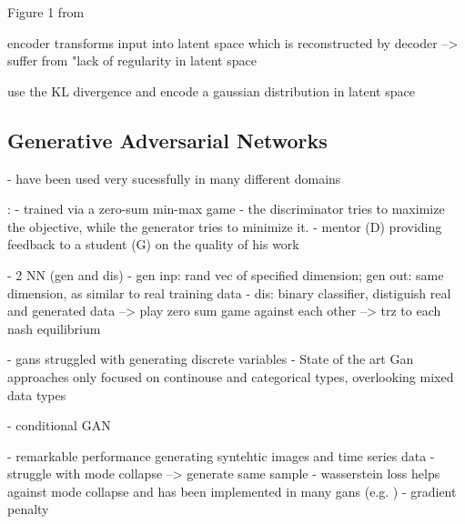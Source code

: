 Figure 1 from \cite{razghandi2022VariationalAutoencoderGenerativea}

encoder transforms input into latent space which is reconstructed by decoder \cite{razghandi2022VariationalAutoencoderGenerativea}
--> suffer from "lack of regularity in latent space \cite{razghandi2022VariationalAutoencoderGenerativea}

use the KL divergence and encode a gaussian distribution in latent space \cite{razghandi2022VariationalAutoencoderGenerativea}


\subsection{Generative Adversarial Networks}
\label{ch:preliminaries-generativeAlgorithms-generativeAdversarialNetworks}

\cite{goodfellow2020GenerativeAdversarialNetworks}
- have been used very sucessfully in many different domains \cite{li2022TTSGANTransformerbasedTimeSeries}
 

\cite{zhao2022CTABGANEnhancingTabular}:
- trained via a zero-sum min-max game 
- the discriminator tries to maximize the objective, while the generator tries to minimize it.
- mentor (D) providing feedback to a student (G) on the quality of his work


\cite{li2022TTSGANTransformerbasedTimeSeries}
- 2 NN (gen and dis)
- gen inp: rand vec of specified dimension; gen out: same dimension, as similar to real training data
- dis: binary classifier, distiguish real and generated data
--> play zero sum game against each other
--> trz to each nash equilibrium

- gans struggled with generating discrete variables \cite{torfi2020CorGANCorrelationCapturingConvolutionala}
- State of the art Gan approaches only focused on continouse and categorical types, overlooking mixed data types \cite{zhao2022CTABGANEnhancingTabular}

- conditional GAN \cite{mirza2014ConditionalGenerativeAdversarial}


- remarkable performance generating syntehtic images and time series data \cite{mckeever2020SynthesisingTabularDatasets}
- struggle with mode collapse --> generate same sample \cite{torfi2020CorGANCorrelationCapturingConvolutionala}
- wasserstein loss helps against mode collapse \cite{frogner2015LearningWassersteinLoss} \cite{arjovsky2017WassersteinGenerativeAdversarial} and has been implemented in many gans (e.g. \cite{zhao2022CTABGANEnhancingTabular})
- gradient penalty \cite{gulrajani2017ImprovedTrainingWasserstein}


